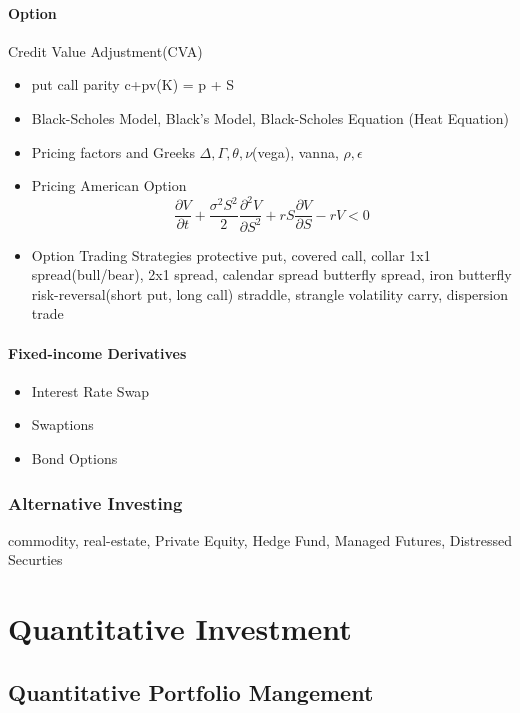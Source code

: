 \documentclass[11pt, openany]{book}              %
\begin{document}
\subsection{Option}

Credit Value Adjustment(CVA)

 \begin{itemize}
  	\item put call parity c+pv(K) = p + S
    \item Black-Scholes Model, Black's Model, Black-Scholes Equation (Heat Equation)
    \item Pricing factors and Greeks $\Delta,\Gamma, \theta, \nu$(vega), vanna, $\rho,\epsilon$ 
    \item Pricing American Option
    $$\frac{\partial V}{\partial t} + \frac{\sigma^2 S^2}{2} \frac{\partial^2 V}{\partial S^2}+ r S \frac{\partial V}{\partial S} - rV < 0 $$
    \item Option Trading Strategies
     \subitem protective put, covered call, collar
     \subitem 1x1 spread(bull/bear), 2x1 spread, calendar spread
     \subitem butterfly spread, iron butterfly
     \subitem risk-reversal(short put, long call)
     \subitem straddle, strangle
     \subitem volatility carry, dispersion trade
\end{itemize}

\subsection{Fixed-income Derivatives}
\begin{itemize}
	\item Interest Rate Swap
	\item Swaptions
	\item Bond Options
\end{itemize}


\section{Alternative Investing}

commodity, real-estate, Private Equity, Hedge Fund, Managed Futures, Distressed Securties

\part{Quantitative Investment}

\chapter{Quantitative Portfolio Mangement}
\end{document}
